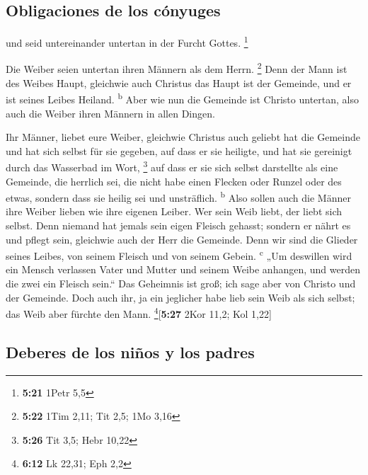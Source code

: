 \hypertarget{obligaciones-de-los-cuxf3nyuges}{%
\subsection{Obligaciones de los
cónyuges}\label{obligaciones-de-los-cuxf3nyuges}}

 und seid untereinander untertan in der Furcht Gottes.
\footnote{\textbf{5:21} 1Petr 5,5}

 Die Weiber seien untertan ihren Männern als dem Herrn.
\footnote{\textbf{5:22} 1Tim 2,11; Tit 2,5; 1Mo 3,16} 
Denn der Mann ist des Weibes Haupt, gleichwie auch Christus das Haupt
ist der Gemeinde, und er ist seines Leibes Heiland. \textsuperscript{b}
 Aber wie nun die Gemeinde ist Christo untertan, also
auch die Weiber ihren Männern in allen Dingen.

 Ihr Männer, liebet eure Weiber, gleichwie Christus auch
geliebt hat die Gemeinde und hat sich selbst für sie gegeben,
 auf dass er sie heiligte, und hat sie gereinigt durch
das Wasserbad im Wort, \footnote{\textbf{5:26} Tit 3,5; Hebr 10,22}
 auf dass er sie sich selbst darstellte als eine
Gemeinde, die herrlich sei, die nicht habe einen Flecken oder Runzel
oder des etwas, sondern dass sie heilig sei und unsträflich.
\textsuperscript{b}  Also sollen auch die Männer ihre
Weiber lieben wie ihre eigenen Leiber. Wer sein Weib liebt, der liebt
sich selbst.  Denn niemand hat jemals sein eigen Fleisch
gehasst; sondern er nährt es und pflegt sein, gleichwie auch der Herr
die Gemeinde.  Denn wir sind die Glieder seines Leibes,
von seinem Fleisch und von seinem Gebein. \textsuperscript{c}
 „Um deswillen wird ein Mensch verlassen Vater und Mutter
und seinem Weibe anhangen, und werden die zwei ein Fleisch sein.``
 Das Geheimnis ist groß; ich sage aber von Christo und
der Gemeinde.  Doch auch ihr, ja ein jeglicher habe lieb
sein Weib als sich selbst; das Weib aber fürchte den Mann.
\footnote{\textbf{6:12} Lk 22,31; Eph 2,2}{[}\textbf{5:27} 2Kor 11,2;
Kol 1,22{]}

\hypertarget{deberes-de-los-niuxf1os-y-los-padres}{%
\subsection{Deberes de los niños y los
padres}\label{deberes-de-los-niuxf1os-y-los-padres}}

